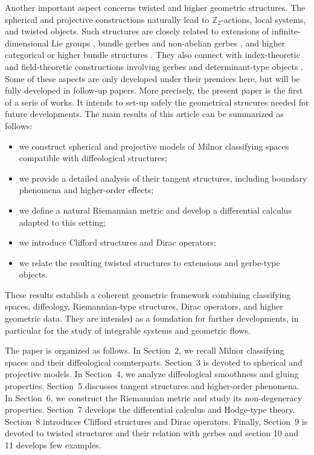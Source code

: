 \documentclass[11pt]{amsart}
\begin{document}
Another important aspect concerns twisted and higher geometric structures. The spherical and projective constructions naturally lead to \(\mathbb Z_2\)-actions, local systems, and twisted objects. Such structures are closely related to extensions of infinite-dimensional Lie groups \cite{Neeb2004,Neeb2007}, bundle gerbes and non-abelian gerbes \cite{Breen2008,BreenMessing2005,Murray1996,NikolausWaldorf2013,Waldorf2007}, and higher categorical or higher bundle structures \cite{BaezLauda2004,Wockel2008}. They also connect with index-theoretic and field-theoretic constructions involving gerbes and determinant-type objects \cite{CareyMickelssonMurray1997,Freed1995}. Some of these aspects are only developed under their premices here, but will be fully developed in follow-up papers. More precisely, the present paper is the first of a serie of works. It intends to set-up safely the geometrical strucures needed for future developments.
The main results of this article can be summarized as follows:
\begin{itemize}
\item we construct spherical and projective models of Milnor classifying spaces compatible with diffeological structures;
\item we provide a detailed analysis of their tangent structures, including boundary phenomena and higher-order effects;
\item we define a natural Riemannian metric and develop a differential calculus adapted to this setting;
\item we introduce Clifford structures and Dirac operators;
\item we relate the resulting twisted structures to extensions and gerbe-type objects.
\end{itemize}

These results establish a coherent geometric framework combining classifying spaces, diffeology, Riemannian-type structures, Dirac operators, and higher geometric data. They are intended as a foundation for further developments, in particular for the study of integrable systems and geometric flows.

The paper is organized as follows. In Section~2, we recall Milnor classifying spaces and their diffeological counterparts. Section~3 is devoted to spherical and projective models. In Section~4, we analyze diffeological smoothness and gluing properties. Section~5 discusses tangent structures and higher-order phenomena. In Section~6, we construct the Riemannian metric and study its non-degeneracy properties. Section~7 develops the differential calculus and Hodge-type theory. Section~8 introduces Clifford structures and Dirac operators. Finally, Section~9 is devoted to twisted structures and their relation with gerbes and section 10 and 11 develops few examples.
\end{document}
